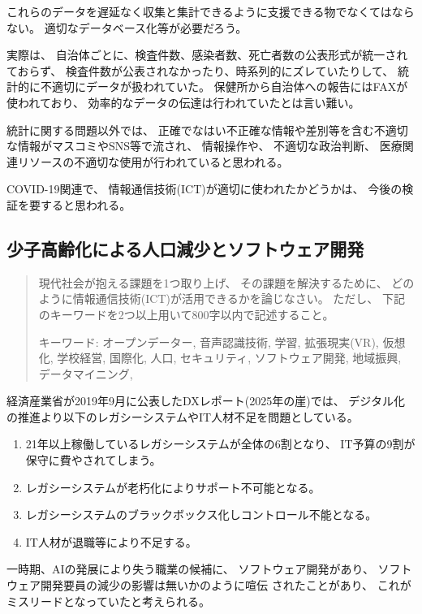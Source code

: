 \documentclass[12pt]{jsarticle}
\begin{document}
これらのデータを遅延なく収集と集計できるように支援できる物でなくてはならない。
適切なデータベース化等が必要だろう。

実際は、
自治体ごとに、検査件数、感染者数、死亡者数の公表形式が統一されておらず、
検査件数が公表されなかったり、時系列的にズレていたりして、
統計的に不適切にデータが扱われていた。
保健所から自治体への報告にはFAXが使われており、
効率的なデータの伝達は行われていたとは言い難い。

統計に関する問題以外では、
正確でなはい不正確な情報や差別等を含む不適切な情報がマスコミやSNS等で流され、
情報操作や、
不適切な政治判断、
医療関連リソースの不適切な使用が行われていると思われる。

COVID-19関連で、
情報通信技術(ICT)が適切に使われたかどうかは、
今後の検証を要すると思われる。


\subsection{
少子高齢化による人口減少とソフトウェア開発
}

\begin{quotation}
現代社会が抱える課題を1つ取り上げ、
その課題を解決するために、
どのように情報通信技術(ICT)が活用できるかを論じなさい。
ただし、
下記のキーワードを2つ以上用いて800字以内で記述すること。

キーワード:
オープンデーター,
音声認識技術,
学習,
拡張現実(VR),
仮想化,
学校経営,
国際化,
人口,
セキュリティ,
ソフトウェア開発,
地域振興,
データマイニング,
\end{quotation}

経済産業省が2019年9月に公表したDXレポート(2025年の崖)では、
デジタル化の推進より以下のレガシーシステムやIT人材不足を問題としている。

\begin{enumerate}
\item 21年以上稼働しているレガシーシステムが全体の6割となり、
      IT予算の9割が保守に費やされてしまう。
\item レガシーシステムが老朽化によりサポート不可能となる。
\item レガシーシステムのブラックボックス化しコントロール不能となる。
\item IT人材が退職等により不足する。
\end{enumerate}

一時期、AIの発展により失う職業の候補に、
ソフトウェア開発があり、
ソフトウェア開発要員の減少の影響は無いかのように喧伝
されたことがあり、
これがミスリードとなっていたと考えられる。
\end{document}
